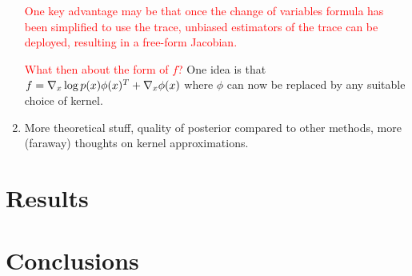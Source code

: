 \documentclass[12pt]{article}
\renewcommand{\[}{\left[}
\renewcommand{\]}{\right]}
\renewcommand{\(}{\left(}
\renewcommand{\)}{\right)}
\newcommand{\grad}[1]{\nabla #1}
\begin{document}
\begin{enumerate}
    \textcolor{red}{One key advantage may be that once the change of variables formula has been simplified to use the trace, unbiased estimators of the trace can be deployed, resulting in a free-form Jacobian.}

    \textcolor{red}{What then about the form of $f$?} One idea is that $f = \grad_x \log p(x) \phi(x)^T + \grad_x \phi(x)$ where $\phi$ can now be replaced by any suitable choice of kernel.

    

    \item More theoretical stuff, quality of posterior compared to other methods, more (faraway) thoughts on kernel approximations.
\end{enumerate}



\section{Results}

\section{Conclusions}



\end{document}
